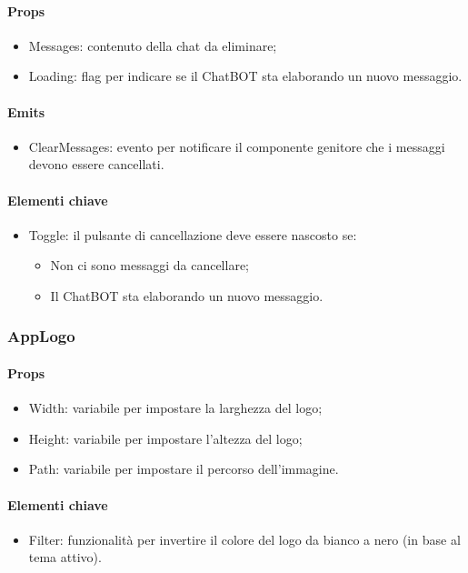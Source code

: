 \paragraph*{Props}
\begin{itemize}
  \item Messages: contenuto della chat da eliminare;
  \item Loading: flag per indicare se il ChatBOT sta elaborando un nuovo messaggio.
\end{itemize}

\paragraph*{Emits}
\begin{itemize}
  \item ClearMessages: evento per notificare il componente genitore che i messaggi devono essere cancellati.
\end{itemize}

\paragraph*{Elementi chiave}
\begin{itemize}
  \item Toggle: il pulsante di cancellazione deve essere nascosto se:
  \begin{itemize}
    \item Non ci sono messaggi da cancellare;
    \item Il ChatBOT sta elaborando un nuovo messaggio.
  \end{itemize}
\end{itemize}

\subsubsection{AppLogo}

\paragraph*{Props}
\begin{itemize}
  \item Width: variabile per impostare la larghezza del logo;
  \item Height: variabile per impostare l'altezza del logo;
  \item Path: variabile per impostare il percorso dell'immagine.
\end{itemize}

\paragraph*{Elementi chiave}
\begin{itemize}
  \item Filter: funzionalità per invertire il colore del logo da bianco a nero (in base al tema attivo).
\end{itemize}